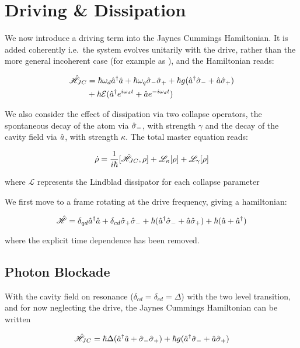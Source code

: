 
\section{Driving \& Dissipation}
We now introduce a driving term into the Jaynes Cummings Hamiltonian. It is added coherently i.e.\ the system evolves unitarily with the drive, rather than the more general incoherent case (for example as \cite{Xu2014}), and the Hamiltonian reads:

\begin{align}
    \hat{\mathscr{H}}_{JC} &= \hbar \omega_d \hat{a}^\dagger \hat{a} + \hbar \omega_q \hat{\sigma}_- \hat{\sigma}_+ +\hbar g (\hat{a}^\dagger \hat{\sigma}_-+ \hat{a} \hat{\sigma}_+)\\
    & + \hbar \mathcal{E} (\hat{a}^\dagger e^{i\omega_d t} + \hat{a} e^{-i\omega_d t})
\end{align}

We also consider the effect of dissipation via two collapse operators, the spontaneous decay of the atom via $\hat{\sigma}_-$, with strength $\gamma$ and the decay of the cavity field via $\hat{a}$, with strength $\kappa$. The total master equation reads:

\begin{equation}
  \dot{\rho} = \frac{1}{i\hbar}[\hat{\mathscr{H}}_{JC}, \rho] + \mathscr{L}_\kappa[\rho] + \mathscr{L}_\gamma[\rho]
\end{equation}

where $\mathscr{L}$ represents the Lindblad dissipator for each collapse parameter

We first move to a frame rotating at the drive frequency, giving a hamiltonian:

\begin{equation}
  \hat{\mathscr{H}} = \delta_{qd} \hat{a}^\dagger \hat{a} + \delta_{cd} \hat{\sigma}_+ \hat{\sigma}_- + \hbar (\hat{a}^\dagger \hat{\sigma}_- + \hat{a} \hat{\sigma}_+) + \hbar (\hat{a} + \hat{a}^\dagger)
\end{equation}

where the explicit time dependence has been removed.

\subsection{Photon Blockade}
With the cavity field on resonance ($\delta_{cd} = \delta_{cd} = \Delta$) with the two level transition, and for now neglecting the drive, the Jaynes Cummings Hamiltonian can be written \cite{Carmichael2015}

\begin{equation}
  \hat{\mathscr{H}}_{JC} = \hbar \Delta (\hat{a}^\dagger \hat{a} + \hat{\sigma}_- \hat{\sigma}_+) +\hbar g (\hat{a}^\dagger \hat{\sigma}_- + \hat{a} \hat{\sigma}_+)
\end{equation}

